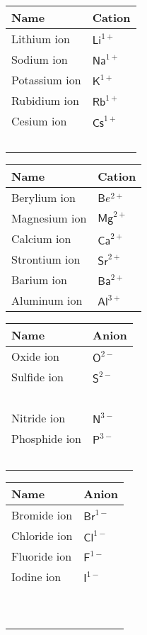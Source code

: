 \documentclass{article}
\theoremstyle{mytheoremstyle}
\theoremstyle{mytheoremstyle}
\theoremstyle{myproblemstyle}
\begin{document}
\begin{tabular}{ll}
    \textbf{Name} & \textbf{Cation} \\
    \hline
    Lithium ion   & \(\mathsf {Li}^{1+}\) \\
    Sodium ion    & \(\mathsf {Na}^{1+}\) \\
    Potassium ion & \(\mathsf K^{1+}\)    \\
    Rubidium ion  & \(\mathsf {Rb}^{1+}\) \\
    Cesium ion    & \(\mathsf {Cs}^{1+}\) \\
    ~             &
\end{tabular}
\begin{tabular}{ll}
    \textbf{Name} & \textbf{Cation} \\
    \hline
    Berylium ion  & \(\mathsf {B}e^{2+}\) \\
    Magnesium ion & \(\mathsf {Mg}^{2+}\) \\
    Calcium ion   & \(\mathsf {Ca}^{2+}\) \\
    Strontium ion & \(\mathsf {Sr}^{2+}\) \\
    Barium ion    & \(\mathsf {Ba}^{2+}\) \\
    Aluminum ion  & \(\mathsf {Al}^{3+}\) \\
\end{tabular}

\begin{tabular}{ll}
    \textbf{Name} & \textbf{Anion} \\
    \hline
    Oxide ion     & \(\mathsf O^{2-}\) \\
    Sulfide ion   & \(\mathsf S^{2-}\) \\
    ~             &              \\
    Nitride ion   & \(\mathsf N^{3-}\) \\
    Phosphide ion & \(\mathsf P^{3-}\) \\
    ~             &              \\
\end{tabular}
\begin{tabular}{ll}
    \textbf{Name} & \textbf{Anion} \\
    \hline
    Bromide ion  & \(\mathsf {Br}^{1-}\) \\
    Chloride ion & \(\mathsf {Cl}^{1-}\) \\
    Fluoride ion & \(\mathsf F^{1-}\)    \\
    Iodine ion   & \(\mathsf I^{1-}\)    \\
    ~            &                 \\
    ~            &                 \\
\end{tabular}
\end{document}
